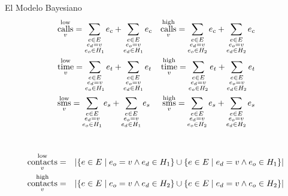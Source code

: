 \documentclass{beamer}
\DeclareMathOperator{\calls}{calls}
\DeclareMathOperator{\etime}{time}
\DeclareMathOperator{\sms}{sms}
\DeclareMathOperator{\contacts}{contacts}
\DeclareMathOperator{\low}{low}
\DeclareMathOperator{\high}{high}
\begin{document}
\begin{frame}{El Modelo Bayesiano}
	\begin{gather*}
		\begin{aligned}
			& \calls^{\low}_v = \sum_{\substack{e \in E \\ e_d = v \\ e_o \in H_1}}{e_c} + \sum_{\substack{e \in E \\ e_o = v \\ e_d \in H_1}}{e_c}
			& \calls^{\high}_v = \sum_{\substack{e \in E \\ e_d = v \\ e_o \in H_2}}{e_c} + \sum_{\substack{e \in E \\ e_o = v \\ e_d \in H_2}}{e_c} \\
			& \etime^{\low}_v = \sum_{\substack{e \in E \\ e_d = v \\ e_o \in H_1}}{e_t} + \sum_{\substack{e \in E \\ e_o = v \\ e_d \in H_1}}{e_t}
			& \etime^{\high}_v = \sum_{\substack{e \in E \\ e_d = v \\ e_o \in H_2}}{e_t} + \sum_{\substack{e \in E \\ e_o = v \\ e_d \in H_2}}{e_t} \\
			& \sms^{\low}_v = \sum_{\substack{e \in E \\ e_d = v \\ e_o \in H_1}}{e_s} + \sum_{\substack{e \in E \\ e_o = v \\ e_d \in H_1}}{e_s}
			& \sms^{\high}_v = \sum_{\substack{e \in E \\ e_d = v \\ e_o \in H_2}}{e_s} + \sum_{\substack{e \in E \\ e_o = v \\ e_d \in H_2}}{e_s}
		\end{aligned} \\
		\vspace{1em} \\
		\begin{aligned}
			\contacts^{\low}_v &= &\left| \left\{ e \in E \mid e_o = v \land e_d \in H_1 \right\} \cup \left\{ e \in E \mid e_d = v \land e_o \in H_1 \right\} \right| \\
			\contacts^{\high}_v &= &\left| \left\{ e \in E \mid e_o = v \land e_d \in H_2 \right\} \cup \left\{ e \in E \mid e_d = v \land e_o \in H_2 \right\} \right|
		\end{aligned}
	\end{gather*}
\end{frame}
\end{document}
